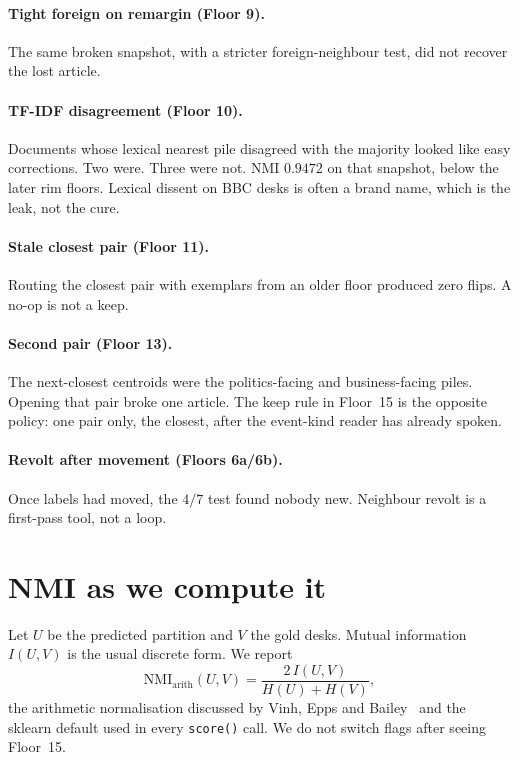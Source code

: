 \documentclass[11pt,a4paper]{article}
\begin{document}
\paragraph{Tight foreign on remargin (Floor 9).}
The same broken snapshot, with a stricter foreign-neighbour
test, did not recover the lost article.

\paragraph{TF-IDF disagreement (Floor 10).}
Documents whose lexical nearest pile disagreed with the
majority looked like easy corrections. Two were. Three were
not. NMI $0.9472$ on that snapshot, below the later rim
floors. Lexical dissent on BBC desks is often a brand name,
which is the leak, not the cure.

\paragraph{Stale closest pair (Floor 11).}
Routing the closest pair with exemplars from an older
floor produced zero flips. A no-op is not a keep.

\paragraph{Second pair (Floor 13).}
The next-closest centroids were the politics-facing and
business-facing piles. Opening that pair broke one article.
The keep rule in Floor~15 is the opposite policy: one pair
only, the closest, after the event-kind reader has already
spoken.

\paragraph{Revolt after movement (Floors 6a/6b).}
Once labels had moved, the $4/7$ test found nobody new.
Neighbour revolt is a first-pass tool, not a loop.

\section{NMI as we compute it}

Let $U$ be the predicted partition and $V$ the gold desks.
Mutual information $I(U,V)$ is the usual discrete form.
We report
\[
\mathrm{NMI}_{\mathrm{arith}}(U,V)=\frac{2\,I(U,V)}{H(U)+H(V)},
\]
the arithmetic normalisation discussed by Vinh, Epps and
Bailey~\cite{vinh2010nmi} and the sklearn default used in
every \texttt{score()} call. We do not switch flags after
seeing Floor~15.
\end{document}
